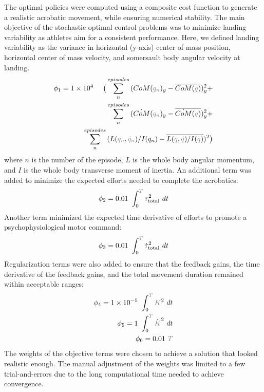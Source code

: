 \documentclass[10pt,letterpaper]{article}
\begin{document}
The optimal policies were computed using a composite cost function to generate a realistic acrobatic movement, while ensuring numerical stability.
The main objective of the stochastic optimal control problems was to minimize landing variability as athletes aim for a consistent performance.
Here, we defined landing variability as the variance in horizontal (y-axis) center of mass position, horizontal center of mass velocity, and somersault body angular velocity at landing.
\begin{eqnarray}
\phi_1 = \num{1e+4}~ \quad \big( \sum_{n}^{episodes}{(CoM(\textcolor{gray}{q_n})_y -\overline{CoM(\textcolor{gray}{q})})_y^2} +\\
 \quad \sum_{n}^{episodes}{(\dot{CoM}(\textcolor{gray}{q_n})_y -\overline{\dot{CoM}(\textcolor{gray}{q})})_y^2} +\\
 \quad \sum_{n}^{episodes}{(L(\textcolor{gray}{q_n}, \textcolor{gray}{\dot{q}_n})/I(q_n) -\overline{L(\textcolor{gray}{q}, \textcolor{gray}{\dot{q}})/I(\textcolor{gray}{q})})^2} \big)
\end{eqnarray}
\noindent where $n$ is the number of the episode, $L$ is the whole body angular momentum, and $I$ is the whole body transverse moment of inertia.
An additional term was added to minimize the expected efforts needed to complete the acrobatics:
\begin{equation}
\phi_2 = 0.01~\int_{0}^{\textcolor{gray}{T}}{\tau_{\text{total}}^2~dt}
\end{equation}
Another term minimized the expected time derivative of efforts to promote a psychophysiological motor command:
\begin{equation}
\phi_3 = 0.01~\int_{0}^{\textcolor{gray}{T}}{{\dot{\tau}_{\text{total}}}^2~dt}
\end{equation}
Regularization terms were also added to ensure that the feedback gains, the time derivative of the feedback gains, and the total movement duration remained within acceptable ranges:
\begin{eqnarray}
\phi_4 = \num{1e-5}~\int_{0}^{\textcolor{gray}{T}}{\textcolor{gray}{K}^2~dt} \\
\phi_5 = 1~\int_{0}^{\textcolor{gray}{T}}{\dot{\textcolor{gray}{K}}^2~dt} \\
\phi_6 = 0.01~\textcolor{gray}{T}
\end{eqnarray}
The weights of the objective terms were chosen to achieve a solution that looked realistic enough. %
The manual adjustment of the weights was limited to a few trial-and-errors due to the long computational time needed to achieve convergence.
\end{document}
